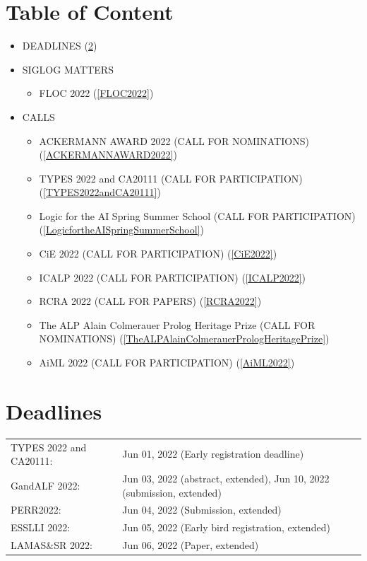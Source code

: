 \documentclass[prodmode,acmtecs]{acmsmall} %
\begin{document}
\section{Table of Content}\begin{itemize}\item DEADLINES (\cref{deadlines}) 
 
\item SIGLOG MATTERS 
 
\begin{itemize}\item FLOC 2022 (\cref{FLOC2022})
\end{itemize} 
\item CALLS 
 
\begin{itemize}\item ACKERMANN AWARD 2022 (CALL FOR NOMINATIONS) (\cref{ACKERMANNAWARD2022})
\item TYPES 2022 and CA20111 (CALL FOR PARTICIPATION) (\cref{TYPES2022andCA20111})
\item Logic for the AI Spring Summer School (CALL FOR PARTICIPATION) (\cref{LogicfortheAISpringSummerSchool})
\item CiE 2022 (CALL FOR PARTICIPATION) (\cref{CiE2022})
\item ICALP 2022 (CALL FOR PARTICIPATION) (\cref{ICALP2022})
\item RCRA 2022 (CALL FOR PAPERS) (\cref{RCRA2022})
\item The ALP Alain Colmerauer Prolog Heritage Prize (CALL FOR NOMINATIONS) (\cref{TheALPAlainColmerauerPrologHeritagePrize})
\item AiML 2022 (CALL FOR PARTICIPATION) (\cref{AiML2022})
\end{itemize} 
\end{itemize}\section{Deadlines}\label{deadlines}\begin{tabulary}{\linewidth}{LL}TYPES 2022 and CA20111:  & Jun 01, 2022 (Early registration deadline) \\
GandALF 2022:  & Jun 03, 2022 (abstract, extended), Jun 10, 2022 (submission, extended) \\
PERR2022:  & Jun 04, 2022 (Submission, extended) \\
ESSLLI 2022:  & Jun 05, 2022 (Early bird registration, extended) \\
LAMAS\&SR 2022:  & Jun 06, 2022 (Paper, extended) \\

\end{tabulary}
\end{document}
